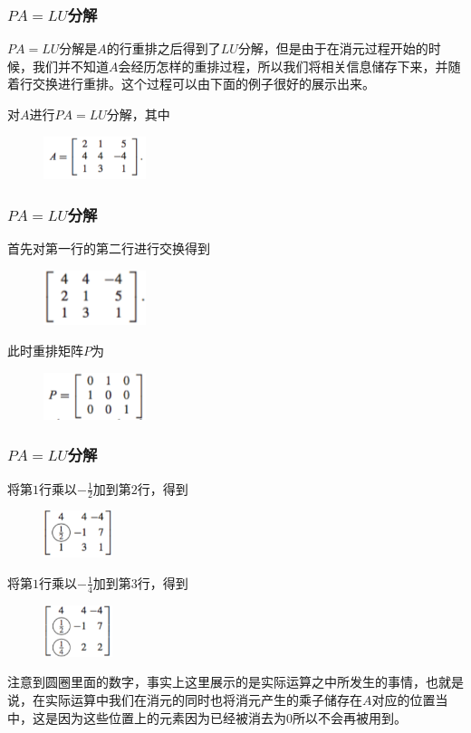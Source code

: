 \documentclass[10pt]{beamer}
\begin{document}
\begin{frame}
\frametitle{$PA = LU$分解}
$PA = LU$分解是$A$的行重排之后得到了$LU$分解，但是由于在消元过程开始的时候，我们并不知道$A$会经历怎样的重排过程，所以我们将相关信息储存下来，并随着行交换进行重排。这个过程可以由下面的例子很好的展示出来。

对$A$进行$PA = LU$分解，其中
\begin{figure}
\includegraphics[width=3cm]{figs/2_4_PA-1} 
\end{figure}
\end{frame}


\begin{frame}
\frametitle{$PA = LU$分解}
首先对第一行的第二行进行交换得到
\begin{figure}
\includegraphics[width=3cm]{figs/2_4_PA-2} 
\end{figure}
此时重排矩阵$P$为
\begin{figure}
\includegraphics[width=3cm]{figs/2_4_PA-3} 
\end{figure}
\end{frame}


\begin{frame}
\frametitle{$PA = LU$分解}
将第$1$行乘以$-\frac{1}{2}$加到第$2$行，得到
\begin{figure}
\includegraphics[width=2cm]{figs/2_4_PA-4} 
\end{figure}
将第$1$行乘以$-\frac{1}{4}$加到第$3$行，得到
\begin{figure}
\includegraphics[width=2cm]{figs/2_4_PA-5} 
\end{figure}
注意到圆圈里面的数字，事实上这里展示的是实际运算之中所发生的事情，也就是说，在实际运算中我们在消元的同时也将消元产生的乘子储存在$A$对应的位置当中，这是因为这些位置上的元素因为已经被消去为$0$所以不会再被用到。
\end{frame}
\end{document}
